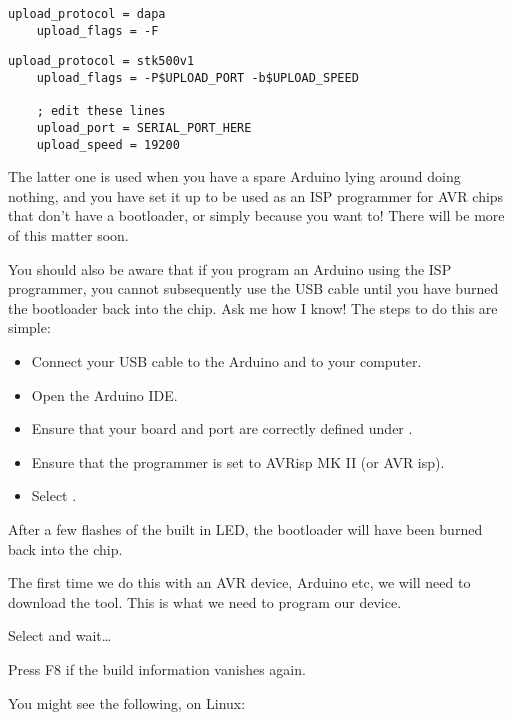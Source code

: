 \begin{lstlisting}[caption={The \inline{platformio.ini} additions for `Parallel Port' ISP Programmer}]
    upload_protocol = dapa
    upload_flags = -F
\end{lstlisting}


\begin{lstlisting}[caption={The \inline{platformio.ini} additions for `Arduino as ISP` Programmer}]
    upload_protocol = stk500v1
    upload_flags = -P$UPLOAD_PORT -b$UPLOAD_SPEED

    ; edit these lines
    upload_port = SERIAL_PORT_HERE
    upload_speed = 19200
\end{lstlisting}

The latter one is used when you have a spare Arduino lying around doing nothing, and you have set it up to be used as an ISP programmer for AVR chips that don't have a bootloader, or simply because you want to! There will be more of this matter soon.

\begin{warning}
You should also be aware that if you program an Arduino using the ISP programmer, you cannot subsequently use the USB cable until you have burned the bootloader back into the chip. Ask me how I know! The steps to do this are simple:

\begin{itemize}
\item Connect your USB cable to the Arduino and to your computer.
\item Open the Arduino IDE.
\item Ensure that your board and port are correctly defined under .
\item Ensure that the programmer is set to AVRisp MK II (or AVR isp).
\item Select .
\end{itemize}

After a few flashes of the built in LED, the bootloader will have been burned back into the chip. 
\end{warning}

The first time we do this with an AVR device, Arduino etc, we will need to
download the  tool. This is what we need to program
our device.

Select  and wait\ldots{}

Press F8 if the build information vanishes again.

You might see the following, on Linux:

